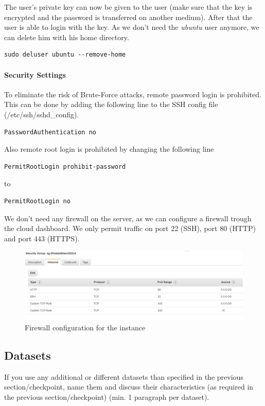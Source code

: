 The user's private key can now be given to the user (make sure that the key is encrypted and the password is transferred on another medium). After that the user is able to login with the key. As we don't need the \textit{ubuntu} user anymore, we can delete him with his home directory.
\begin{lstlisting}
sudo deluser ubuntu --remove-home 
\end{lstlisting}

\paragraph{Security Settings}
To eliminate the risk of Brute-Force attacks, remote password login is prohibited. This can be done by adding the following line to the SSH config file (/etc/ssh/sshd\_config).
\begin{lstlisting}
PasswordAuthentication no
\end{lstlisting}

Also remote root login is prohibited by changing the following line
\begin{lstlisting}
PermitRootLogin prohibit-password
\end{lstlisting}
to
\begin{lstlisting}
PermitRootLogin no
\end{lstlisting}

We don't need any firewall on the server, as we can configure a firewall trough the cloud dashboard. We only permit traffic on port 22 (SSH), port 80 (HTTP) and port 443 (HTTPS).
\begin{figure}[H]
	\centering
	\includegraphics[width=\textwidth]{img/Security-Group}
	\caption{Firewall configuration for the instance}
	\label{fig:SecGroup}
\end{figure}

\subsection{Datasets}

If you use any additional or different datasets than specified in the previous
section/checkpoint, name them and discuss their characteristics (as required in
the previous section/checkpoint) (min. 1 paragraph per dataset).

